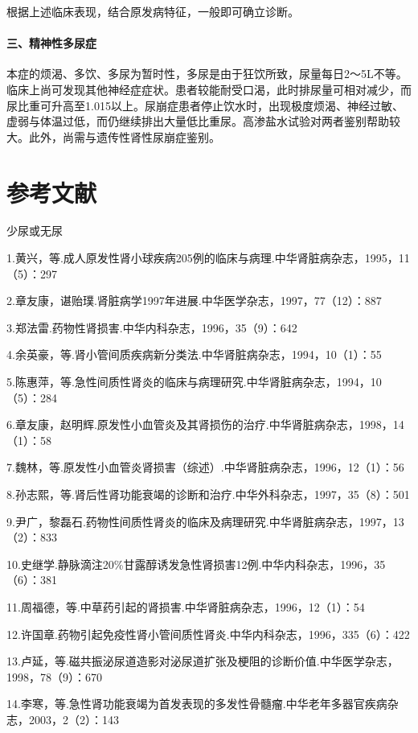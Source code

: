 根据上述临床表现，结合原发病特征，一般即可确立诊断。

\paragraph{三、精神性多尿症}

本症的烦渴、多饮、多尿为暂时性，多尿是由于狂饮所致，尿量每日2～5L不等。临床上尚可发现其他神经症症状。患者较能耐受口渴，此时排尿量可相对减少，而尿比重可升高至1.015以上。尿崩症患者停止饮水时，出现极度烦渴、神经过敏、虚弱与体温过低，而仍继续排出大量低比重尿。高渗盐水试验对两者鉴别帮助较大。此外，尚需与遗传性肾性尿崩症鉴别。

\protect\hypertarget{text00274.html}{}{}

\section{参考文献}

少尿或无尿

1.黄兴，等.成人原发性肾小球疾病205例的临床与病理.中华肾脏病杂志，1995，11（5）：297

2.章友康，谌贻璞.肾脏病学1997年进展.中华医学杂志，1997，77（12）：887

3.郑法雷.药物性肾损害.中华内科杂志，1996，35（9）：642

4.余英豪，等.肾小管间质疾病新分类法.中华肾脏病杂志，1994，10（1）：55

5.陈惠萍，等.急性间质性肾炎的临床与病理研究.中华肾脏病杂志，1994，10（5）：284

6.章友康，赵明辉.原发性小血管炎及其肾损伤的治疗.中华肾脏病杂志，1998，14（1）：58

7.魏林，等.原发性小血管炎肾损害（综述）.中华肾脏病杂志，1996，12（1）：56

8.孙志熙，等.肾后性肾功能衰竭的诊断和治疗.中华外科杂志，1997，35（8）：501

9.尹广，黎磊石.药物性间质性肾炎的临床及病理研究.中华肾脏病杂志，1997，13（2）：833

10.史继学.静脉滴注20\%甘露醇诱发急性肾损害12例.中华内科杂志，1996，35（6）：381

11.周福德，等.中草药引起的肾损害.中华肾脏病杂志，1996，12（1）：54

12.许国章.药物引起免疫性肾小管间质性肾炎.中华内科杂志，1996，335（6）：422

13.卢延，等.磁共振泌尿道造影对泌尿道扩张及梗阻的诊断价值.中华医学杂志，1998，78（9）：670

14.李寒，等.急性肾功能衰竭为首发表现的多发性骨髓瘤.中华老年多器官疾病杂志，2003，2（2）：143

